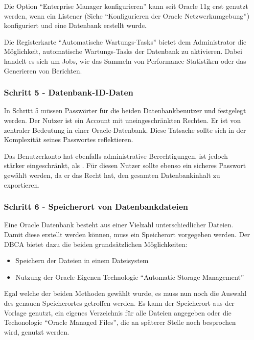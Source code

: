           \begin{merke}
            Die Option \enquote{Enterprise Manager konfigurieren} kann seit Oracle 11g erst genutzt werden, wenn ein Listener (Siehe \enquote{Konfigurieren der Oracle Netzwerkumgebung}) konfiguriert und eine Datenbank erstellt wurde.
          \end{merke}
          Die Registerkarte \enquote{Automatische Wartungs-Tasks} bietet dem Administrator die Möglichkeit, automatische Wartungs-Tasks der Datenbank zu aktivieren. Dabei handelt es sich um Jobs, wie das Sammeln von Performance-Statistiken oder das Generieren von Berichten.
        \subsubsection{Schritt 5 - Datenbank-ID-Daten}
          In Schritt 5 müssen Passwörter für die beiden Datenbankbenutzer  und  festgelegt werden. Der Nutzer  ist ein Account mit uneingeschränkten Rechten. Er ist von zentraler Bedeutung in einer Oracle-Datenbank. Diese Tatsache sollte sich in der Komplexität seines Passwortes reflektieren.

          Das Benutzerkonto  hat ebenfalls administrative Berechtigungen, ist jedoch stärker eingeschränkt, als . Für diesen Nutzer sollte ebenso ein sicheres Passwort gewählt werden, da er das Recht hat, den gesamten Datenbankinhalt zu exportieren.

        \subsubsection{Schritt 6 - Speicherort von Datenbankdateien}
          Eine Oracle Datenbank besteht aus einer Vielzahl unterschiedlicher Dateien. Damit diese erstellt werden können, muss ein Speicherort vorgegeben werden. Der DBCA bietet dazu die beiden grundsätzlichen Möglichkeiten:
          \begin{itemize}
            \item Speichern der Dateien in einem Dateisystem
            \item Nutzung der Oracle-Eigenen Technologie \enquote{Automatic Storage Management}
          \end{itemize}
          Egal welche der beiden Methoden gewählt wurde, es muss nun noch die Auswahl des genauen Speicherortes getroffen werden. Es kann der Speicherort aus der Vorlage genutzt, ein eigenes Verzeichnis für alle Dateien angegeben oder die Techonologie \enquote{Oracle Managed Files}, die an späterer Stelle noch besprochen wird, genutzt werden.


